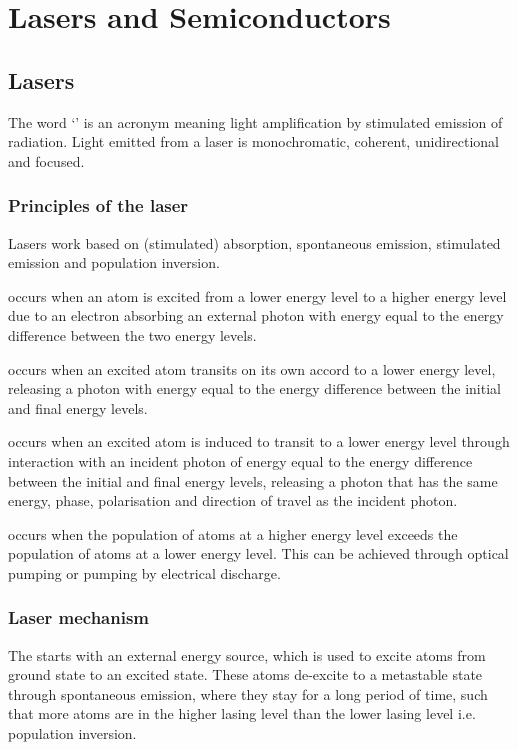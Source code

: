 \documentclass[Physics.tex]{subfiles}
\begin{document}
\chapter{Lasers and Semiconductors}
\section{Lasers}
The word `' is an acronym meaning light amplification by stimulated emission of radiation. Light emitted from a laser is monochromatic, coherent, unidirectional and focused.
\subsection{Principles of the laser}
Lasers work based on (stimulated) absorption, spontaneous emission, stimulated emission and population inversion.

 occurs when an atom is excited from a lower energy level to a higher energy level due to an electron absorbing an external photon with energy equal to the energy difference between the two energy levels.

 occurs when an excited atom transits on its own accord to a lower energy level, releasing a photon with energy equal to the energy difference between the initial and final energy levels.

 occurs when an excited atom is induced to transit to a lower energy level through interaction with an incident photon of energy equal to the energy difference between the initial and final energy levels, releasing a photon that has the same energy, phase, polarisation and direction of travel as the incident photon.

 occurs when the population of atoms at a higher energy level exceeds the population of atoms at a lower energy level. This can be achieved through optical pumping or pumping by electrical discharge.
\subsection{Laser mechanism}
The  starts with an external energy source, which is used to excite atoms from ground state to an excited state. These atoms de-excite to a metastable state through spontaneous emission, where they stay for a long period of time, such that more atoms are in the higher lasing level than the lower lasing level i.e. population inversion.
\end{document}
